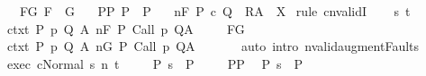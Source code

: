 \begin{isabellebody}
\ \ \ F{\isacharunderscore}G{\isacharcolon}\ {\isachardoublequoteopen}F\ {\isasymsubseteq}\ G{\isachardoublequoteclose}\isanewline
\ \ \ P{\isacharunderscore}P{\isacharprime}{\isacharcolon}\ {\isachardoublequoteopen}P\ {\isasymsubseteq}\ P{\isacharprime}{\isachardoublequoteclose}\isanewline
\ \ \ {\isachardoublequoteopen}{\isasymGamma}{\isacharcomma}{\isasymTheta}{\isasymTurnstile}n{\isacharcolon}\isactrlbsub {\isacharslash}F\isactrlesub \ P\ c\ {\isacharparenleft}Q\ {\isasyminter}\ R{\isacharparenright}{\isacharcomma}{\isacharparenleft}A\ {\isasyminter}\ X{\isacharparenright}{\isachardoublequoteclose}\isanewline
%
\isadelimproof
%
\endisadelimproof
%
\isatagproof
{}\isamarkupfalse%
\ {\isacharparenleft}rule\ cnvalidI{\isacharparenright}\isanewline
\ \ \isamarkupfalse%
\ s\ t\isanewline
\ \ \isamarkupfalse%
\ ctxt{\isacharcolon}\ {\isachardoublequoteopen}{\isasymforall}{\isacharparenleft}P{\isacharcomma}\ p{\isacharcomma}\ Q{\isacharcomma}\ A{\isacharparenright}{\isasymin}{\isasymTheta}{\isachardot}\ {\isasymGamma}{\isasymTurnstile}n{\isacharcolon}\isactrlbsub {\isacharslash}F\isactrlesub \ P\ {\isacharparenleft}Call\ p{\isacharparenright}\ Q{\isacharcomma}A{\isachardoublequoteclose}\ \isanewline
\ \ \isamarkupfalse%
\ F{\isacharunderscore}G\ \isamarkupfalse%
\ ctxt{\isacharprime}{\isacharcolon}\ {\isachardoublequoteopen}{\isasymforall}{\isacharparenleft}P{\isacharcomma}\ p{\isacharcomma}\ Q{\isacharcomma}\ A{\isacharparenright}{\isasymin}{\isasymTheta}{\isachardot}\ {\isasymGamma}{\isasymTurnstile}n{\isacharcolon}\isactrlbsub {\isacharslash}G\isactrlesub \ P\ {\isacharparenleft}Call\ p{\isacharparenright}\ Q{\isacharcomma}A{\isachardoublequoteclose}\ \isanewline
\ \ \ \ \isamarkupfalse%
\ {\isacharparenleft}auto\ intro{\isacharcolon}\ nvalid{\isacharunderscore}augment{\isacharunderscore}Faults{\isacharparenright}\isanewline
\ \ \isamarkupfalse%
\ exec{\isacharcolon}\ {\isachardoublequoteopen}{\isasymGamma}{\isasymturnstile}{\isasymlangle}c{\isacharcomma}Normal\ s{\isasymrangle}\ {\isacharequal}n{\isasymRightarrow}\ t{\isachardoublequoteclose}\ \isanewline
\ \ \isamarkupfalse%
\ P{\isacharcolon}\ {\isachardoublequoteopen}s\ {\isasymin}\ P{\isachardoublequoteclose}\ \isanewline
\ \ \isamarkupfalse%
\ P{\isacharunderscore}P{\isacharprime}\ \isamarkupfalse%
\ P{\isacharprime}{\isacharcolon}\ {\isachardoublequoteopen}s\ {\isasymin}\ P{\isacharprime}{\isachardoublequoteclose}\isanewline

\end{isabellebody}
